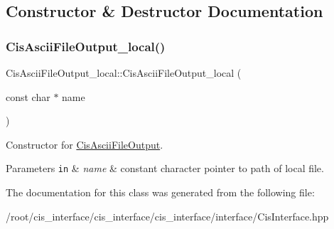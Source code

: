 \subsection{Constructor \& Destructor Documentation}
\mbox{\label{classCisAsciiFileOutput__local_a879ac5cab1e7f7b8625cef59e239db91}} 
\subsubsection{\texorpdfstring{Cis\+Ascii\+File\+Output\+\_\+local()}{CisAsciiFileOutput\_local()}}
{\footnotesize\ttfamily Cis\+Ascii\+File\+Output\+\_\+local\+::\+Cis\+Ascii\+File\+Output\+\_\+local (\begin{DoxyParamCaption}\item[{const char $\ast$}]{name }\end{DoxyParamCaption})\hspace{0.3cm}{\ttfamily [inline]}}



Constructor for \mbox{\hyperlink{classCisAsciiFileOutput}{Cis\+Ascii\+File\+Output}}. 


\begin{DoxyParams}[1]{Parameters}
\mbox{\tt in}  & {\em name} & constant character pointer to path of local file. \\
\hline
\end{DoxyParams}


The documentation for this class was generated from the following file\+:\begin{DoxyCompactItemize}
\item 
/root/cis\+\_\+interface/cis\+\_\+interface/cis\+\_\+interface/interface/Cis\+Interface.\+hpp\end{DoxyCompactItemize}
